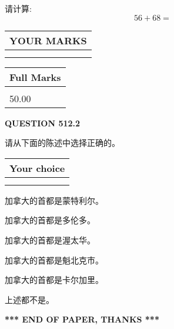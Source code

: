 \documentclass{ctexart}
\begin{document}
  
 
请计算:
\begin{equation}
56 +  %
68 = \nonumber
\end{equation}
 

 

 
  
\vspace{0.2in}
  
\noindent\begin{tabular}{|l|}
\hline
 YOUR MARKS  \\
\hline
 \\ 
 \\ 
\hline
\end{tabular}
\hspace{0.05in} \begin{tabular}{|l|}
\hline
 Full Marks  \\
\hline
 \\ 
50.00 \\
\hline
\end{tabular}
{\textbf{\Large{QUESTION
512.2 
}}}
  
  
请从下面的陈述中选择正确的。
  
  
\noindent\hspace{3.0in} \begin{tabular}{|l|}
\hline
Your choice \\
\hline
 \\ 
 \\ 
\hline
\end{tabular}
  
  
 
 
加拿大的首都是蒙特利尔。
 
 
加拿大的首都是多伦多。
 
 
加拿大的首都是渥太华。
 
 
加拿大的首都是魁北克市。
 
 
加拿大的首都是卡尔加里。
 
 
 上述都不是。
 
 
   
   
 \vspace{0.2in}
 
   
   
   
   
\vspace{1.0in} 
{\textbf{\large{ *** END OF PAPER, THANKS *** }}} 
   
\end{document}
